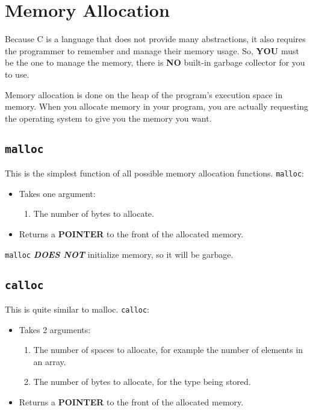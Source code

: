 \section{Memory Allocation}\label{sec:Memory_Allocation}
Because C is a language that does not provide many abstractions, it also requires the programmer to remember and manage their memory usage.
So, \textbf{YOU} must be the one to manage the memory, there is \textbf{NO} built-in garbage collector for you to use.

Memory allocation is done on the heap of the program's execution space in memory.
When you allocate memory in your program, you are actually requesting the operating system to give you the memory you want.

\subsection{\texttt{malloc}}\label{subsec:malloc}
This is the simplest function of all possible memory allocation functions.
\texttt{malloc}:
\begin{itemize}
\item Takes one argument:
  \begin{enumerate}
  \item The number of bytes to allocate.
  \end{enumerate}
\item Returns a \textbf{POINTER} to the front of the allocated memory.
\end{itemize}

\texttt{malloc} {\large{\textbf{\emph{DOES NOT}}}} initialize memory, so it will be garbage.

\subsection{\texttt{calloc}}\label{subsec:calloc}
This is quite similar to malloc.
\texttt{calloc}:
\begin{itemize}
\item Takes 2 arguments:
  \begin{enumerate}
  \item The number of spaces to allocate, for example the number of elements in an array.
  \item The number of bytes to allocate, for the type being stored.
  \end{enumerate}
\item Returns a \textbf{POINTER} to the front of the allocated memory.
\end{itemize}


